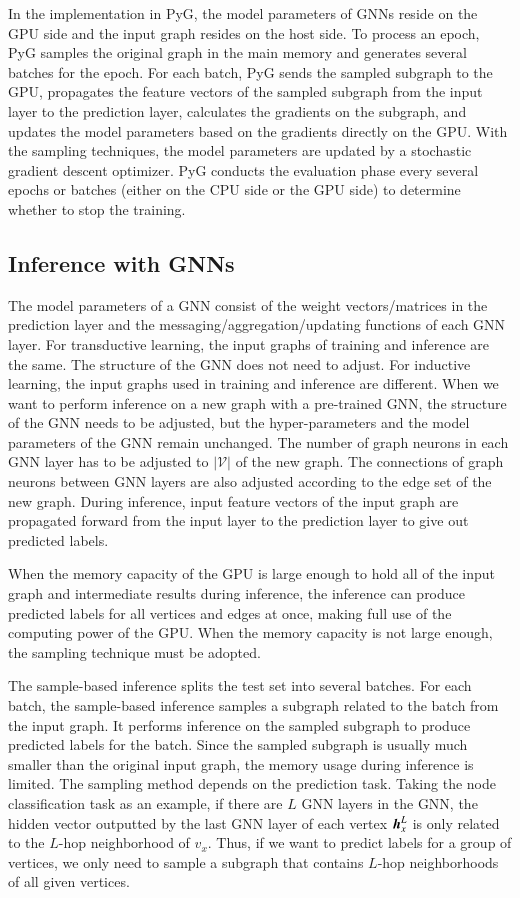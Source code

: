 In the implementation in PyG, the model parameters of GNNs reside on the GPU side and the input graph resides on the host side.
%
To process an epoch, PyG samples the original graph in the main memory and generates several batches for the epoch.
%
For each batch, PyG sends the sampled subgraph to the GPU, propagates the feature vectors of the sampled subgraph from the input layer to the prediction layer, calculates the gradients on the subgraph, and updates the model parameters based on the gradients directly on the GPU.
%
With the sampling techniques, the model parameters are updated by a stochastic gradient descent optimizer.
%
PyG conducts the evaluation phase every several epochs or batches (either on the CPU side or the GPU side) to determine whether to stop the training.


\subsection{Inference with GNNs}

The model parameters of a GNN consist of the weight vectors/matrices in the prediction layer and the messaging/aggregation/updating functions of each GNN layer.
%
For transductive learning, the input graphs of training and inference are the same.
%
The structure of the GNN does not need to adjust. 
%
For inductive learning, the input graphs used in training and inference are different.
%
When we want to perform inference on a new graph with a pre-trained GNN, the structure of the GNN needs to be adjusted, but the hyper-parameters and the model parameters of the GNN remain unchanged.
%
The number of graph neurons in each GNN layer has to be adjusted to $|\mathcal{V}|$ of the new graph.
%
The connections of graph neurons between GNN layers are also adjusted according to the edge set of the new graph.
%
During inference, input feature vectors of the input graph are propagated forward from the input layer to the prediction layer to give out predicted labels.

When the memory capacity of the GPU is large enough to hold all of the input graph and intermediate results during inference, the inference can produce predicted labels for all vertices and edges at once, making full use of the computing power of the GPU.
%
When the memory capacity is not large enough, the sampling technique must be adopted.

The sample-based inference splits the test set into several batches.
%
For each batch, the sample-based inference samples a subgraph related to the batch from the input graph.
%
It performs inference on the sampled subgraph to produce predicted labels for the batch.
%
Since the sampled subgraph is usually much smaller than the original input graph, the memory usage during inference is limited.
%
The sampling method depends on the prediction task.
%
Taking the node classification task as an example, if there are $L$ GNN layers in the GNN, the hidden vector outputted by the last GNN layer of each vertex $\boldsymbol{h}^L_x$ is only related to the $L$-hop neighborhood of $v_x$.
%
Thus, if we want to predict labels for a group of vertices, we only need to sample a subgraph that contains $L$-hop neighborhoods of all given vertices.

